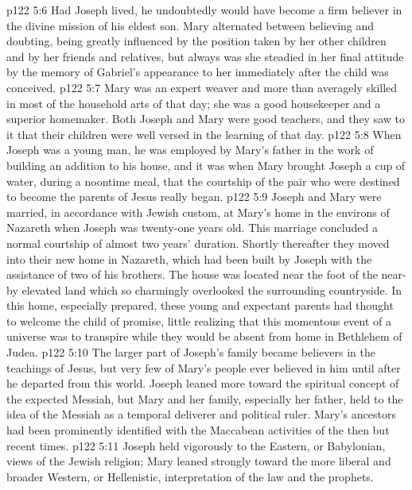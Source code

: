 \vs p122 5:6 Had Joseph lived, he undoubtedly would have become a firm believer in the divine mission of his eldest son. Mary alternated between believing and doubting, being greatly influenced by the position taken by her other children and by her friends and relatives, but always was she steadied in her final attitude by the memory of Gabriel’s appearance to her immediately after the child was conceived.
\vs p122 5:7 Mary was an expert weaver and more than averagely skilled in most of the household arts of that day; she was a good housekeeper and a superior homemaker. Both Joseph and Mary were good teachers, and they saw to it that their children were well versed in the learning of that day.
\vs p122 5:8 \pc When Joseph was a young man, he was employed by Mary’s father in the work of building an addition to his house, and it was when Mary brought Joseph a cup of water, during a noontime meal, that the courtship of the pair who were destined to become the parents of Jesus really began.
\vs p122 5:9 Joseph and Mary were married, in accordance with Jewish custom, at Mary’s home in the environs of Nazareth when Joseph was twenty\hyp{}one years old. This marriage concluded a normal courtship of almost two years’ duration. Shortly thereafter they moved into their new home in Nazareth, which had been built by Joseph with the assistance of two of his brothers. The house was located near the foot of the near\hyp{}by elevated land which so charmingly overlooked the surrounding countryside. In this home, especially prepared, these young and expectant parents had thought to welcome the child of promise, little realizing that this momentous event of a universe was to transpire while they would be absent from home in Bethlehem of Judea.
\vs p122 5:10 \pc The larger part of Joseph’s family became believers in the teachings of Jesus, but very few of Mary’s people ever believed in him until after he departed from this world. Joseph leaned more toward the spiritual concept of the expected Messiah, but Mary and her family, especially her father, held to the idea of the Messiah as a temporal deliverer and political ruler. Mary’s ancestors had been prominently identified with the Maccabean activities of the then but recent times.
\vs p122 5:11 Joseph held vigorously to the Eastern, or Babylonian, views of the Jewish religion; Mary leaned strongly toward the more liberal and broader Western, or Hellenistic, interpretation of the law and the prophets.
